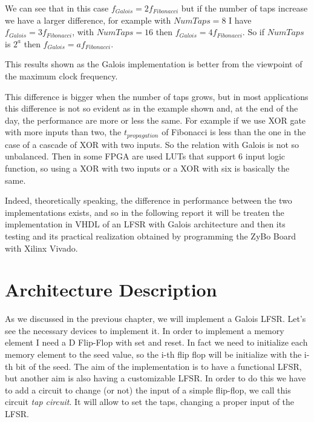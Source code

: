 \documentclass[a4paper]{report}
\begin{document}
\noindent We can see that in this case $f_{Galois}=2f_{Fibonacci}$ but if the number of taps increase we have a larger difference, for example with $NumTaps = 8$ I have $f_{Galois} = 3f_{Fibonacci}$, with $NumTaps=16$ then $f_{Galois} = 4f_{Fibonacci}$. So if $NumTaps$ is $2^a$ then $f_{Galois} = af_{Fibonacci}$.

\noindent This results shown as the Galois implementation is better from the viewpoint of the maximum clock frequency.

\noindent This difference is bigger when the number of taps grows, but in most applications this difference is not so evident as in the example shown and, at the end of the day, the performance are more or less the same. For example if we use XOR gate with more inputs than two, the $t_{propagation}$ of Fibonacci is less than the one in the case of a cascade of XOR with two inputs. So the relation with Galois is not so unbalanced. Then in some FPGA are used LUTs that support 6 input logic function, so using a XOR with two inputs or a XOR with six is basically the same.

\noindent Indeed, theoretically speaking, the difference in performance between the two implementations exists, and so in the following report it will be treaten the implementation in VHDL of an LFSR with Galois architecture and then its testing and its practical realization obtained by programming the ZyBo Board with Xilinx Vivado. 

\chapter{Architecture Description}
As we discussed in the previous chapter, we will implement a Galois LFSR. Let's see the necessary devices to implement it.
In order to implement a memory element I need a D Flip-Flop with set and reset. In fact we need to initialize each memory element to the seed value, so the i-th flip flop will be initialize with the i-th bit of the seed.
The aim of the implementation is to have a functional LFSR, but another aim is also having a customizable LFSR. In order to do this we have to add a circuit to change (or not) the input of a simple flip-flop, we call this circuit \emph{tap circuit}. It will allow to set the taps, changing a proper input of the LFSR.
\end{document}
